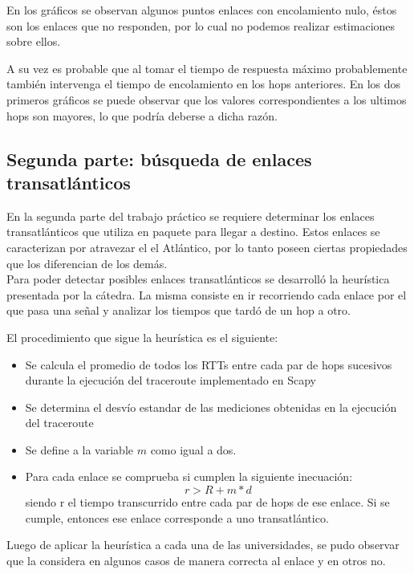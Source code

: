 En los gráficos se observan algunos puntos enlaces con encolamiento nulo, éstos son los enlaces que no responden, por lo cual no podemos realizar estimaciones sobre ellos.

A su vez es probable que al tomar el tiempo de respuesta máximo probablemente también intervenga el tiempo de encolamiento en los hops anteriores. En los dos primeros gráficos se
puede observar que los valores correspondientes a los ultimos hops son mayores, lo que podría deberse a dicha razón.

\subsection{Segunda parte: búsqueda de enlaces transatlánticos}

En la segunda parte del trabajo práctico se requiere determinar los enlaces transatlánticos que utiliza en paquete para llegar a destino. Estos enlaces se caracterizan por atravezar el el Atlántico, por lo tanto poseen ciertas propiedades que los diferencian de los demás. \\

Para poder detectar posibles enlaces transatlánticos se desarrolló la heurística presentada por la cátedra. La misma consiste en ir recorriendo cada enlace por el que pasa una señal y analizar los tiempos que tardó de un hop a otro. 

El procedimiento que sigue la heurística es el siguiente:
\begin{itemize}
	\item Se calcula el promedio de todos los RTTs entre cada par de hops sucesivos durante la ejecución del traceroute implementado en Scapy
	\item Se determina el desvío estandar de las mediciones obtenidas en la ejecución del traceroute
	\item Se define a la variable $m$ como igual a dos.
	\item Para cada enlace se comprueba si cumplen la siguiente inecuación: 
	\begin{equation}
		r > R + m * d
	\end{equation}
	siendo r el tiempo transcurrido entre cada par de hops de ese enlace. Si se cumple, entonces ese enlace corresponde a uno transatlántico.
\end{itemize}

Luego de aplicar la heurística a cada una de las universidades, se pudo observar que la considera en algunos casos de manera correcta al enlace y en otros no. 

